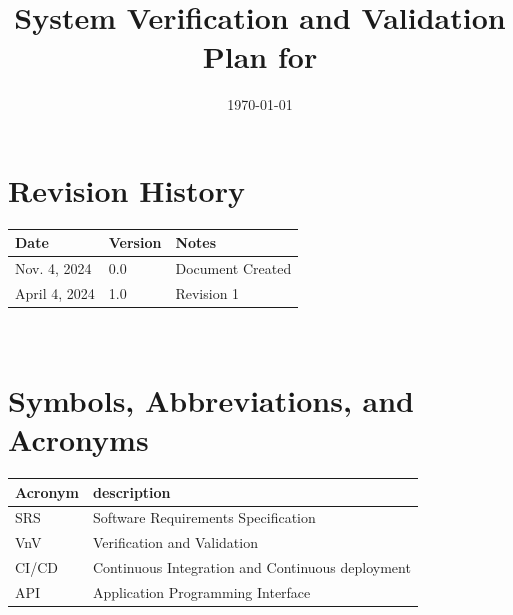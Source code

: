 \documentclass[12pt, titlepage]{article}
\begin{document}
\title{System Verification and Validation Plan for \progname{}} 
\author{\authname}
\date{\today}
	
\maketitle


\section*{Revision History}

\begin{tabularx}{\textwidth}{p{3cm}p{2cm}X}
\toprule {\bf Date} & {\bf Version} & {\bf Notes}\\
\midrule
Nov. 4, 2024 & 0.0 & Document Created\\
April 4, 2024 & 1.0 & Revision 1\\
\bottomrule
\end{tabularx}

~\\


\newpage

\tableofcontents

\listoftables

\listoffigures

\newpage

\section{Symbols, Abbreviations, and Acronyms}

\renewcommand{\arraystretch}{1.2}
\begin{tabular}{l l} 
  \toprule		
  \textbf{Acronym} & \textbf{description}\\
  \midrule 
  SRS & Software Requirements Specification\\
  VnV & Verification and Validation\\
  CI/CD & Continuous Integration and Continuous deployment\\   
  API & Application Programming Interface\\
  \bottomrule
\end{tabular}\\

\newpage

\end{document}
